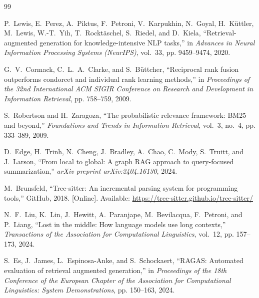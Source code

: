 \documentclass[12pt,letterpaper,oneside]{report}
\begin{document}
\sloppy
\begin{singlespace}
\begin{thebibliography}{99}

P.~Lewis, E.~Perez, A.~Piktus, F.~Petroni, V.~Karpukhin, N.~Goyal, H.~K{\"u}ttler, M.~Lewis, W.-T.~Yih, T.~Rockt{\"a}schel, S.~Riedel, and D.~Kiela, ``Retrieval-augmented generation for knowledge-intensive NLP tasks,'' in \textit{Advances in Neural Information Processing Systems (NeurIPS)}, vol.~33, pp. 9459--9474, 2020.

G.~V.~Cormack, C.~L.~A.~Clarke, and S.~B{\"u}ttcher, ``Reciprocal rank fusion outperforms condorcet and individual rank learning methods,'' in \textit{Proceedings of the 32nd International ACM SIGIR Conference on Research and Development in Information Retrieval}, pp. 758--759, 2009.

S.~Robertson and H.~Zaragoza, ``The probabilistic relevance framework: BM25 and beyond,'' \textit{Foundations and Trends in Information Retrieval}, vol.~3, no.~4, pp. 333--389, 2009.

D.~Edge, H.~Trinh, N.~Cheng, J.~Bradley, A.~Chao, C.~Mody, S.~Truitt, and J.~Larson, ``From local to global: A graph RAG approach to query-focused summarization,'' \textit{arXiv preprint arXiv:2404.16130}, 2024.

M.~Brunsfeld, ``Tree-sitter: An incremental parsing system for programming tools,'' GitHub, 2018. [Online]. Available: \url{https://tree-sitter.github.io/tree-sitter/}

N.~F.~Liu, K.~Lin, J.~Hewitt, A.~Paranjape, M.~Bevilacqua, F.~Petroni, and P.~Liang, ``Lost in the middle: How language models use long contexts,'' \textit{Transactions of the Association for Computational Linguistics}, vol.~12, pp. 157--173, 2024.

S.~Es, J.~James, L.~Espinosa-Anke, and S.~Schockaert, ``RAGAS: Automated evaluation of retrieval augmented generation,'' in \textit{Proceedings of the 18th Conference of the European Chapter of the Association for Computational Linguistics: System Demonstrations}, pp. 150--163, 2024.


\end{thebibliography}
\end{singlespace}
\end{document}
